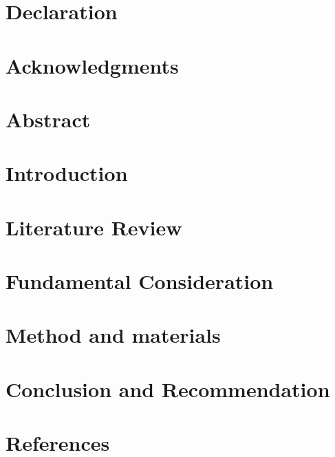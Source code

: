\documentclass[english,12pt,a4paper]{report}
\begin{document}
	\begin{sloppypar}
	
	\chapter*{Declaration}
	
	\chapter*{Acknowledgments}
		
	\chapter*{Abstract}
		
		
	
	
		
\chapter{Introduction}
	
\chapter{Literature Review}
	
\chapter{Fundamental Consideration}
	
\chapter{Method and materials}
	
\chapter{Conclusion and Recommendation}
	
\chapter{References}		
	
\end{sloppypar}
\end{document}
